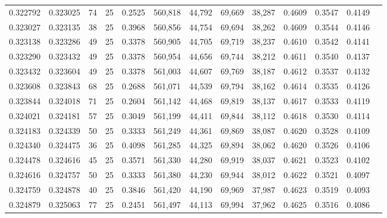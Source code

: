 \begin{tabular}{rrrrrrrrrrrrr}
0.322792 & 0.323025 &    74 &  25 &                                     0.2525 & 560,818 &  44,792 &  69,669 &  38,287 & 0.4609 & 0.3547 & 0.4149 \\
0.323027 & 0.323135 &    38 &  25 &                                     0.3968 & 560,856 &  44,754 &  69,694 &  38,262 & 0.4609 & 0.3544 & 0.4146 \\
0.323138 & 0.323286 &    49 &  25 &                                     0.3378 & 560,905 &  44,705 &  69,719 &  38,237 & 0.4610 & 0.3542 & 0.4141 \\
0.323290 & 0.323432 &    49 &  25 &                                     0.3378 & 560,954 &  44,656 &  69,744 &  38,212 & 0.4611 & 0.3540 & 0.4137 \\
0.323432 & 0.323604 &    49 &  25 &                                     0.3378 & 561,003 &  44,607 &  69,769 &  38,187 & 0.4612 & 0.3537 & 0.4132 \\
0.323608 & 0.323843 &    68 &  25 &                                     0.2688 & 561,071 &  44,539 &  69,794 &  38,162 & 0.4614 & 0.3535 & 0.4126 \\
0.323844 & 0.324018 &    71 &  25 &                                     0.2604 & 561,142 &  44,468 &  69,819 &  38,137 & 0.4617 & 0.3533 & 0.4119 \\
0.324021 & 0.324181 &    57 &  25 &                                     0.3049 & 561,199 &  44,411 &  69,844 &  38,112 & 0.4618 & 0.3530 & 0.4114 \\
0.324183 & 0.324339 &    50 &  25 &                                     0.3333 & 561,249 &  44,361 &  69,869 &  38,087 & 0.4620 & 0.3528 & 0.4109 \\
0.324340 & 0.324475 &    36 &  25 &                                     0.4098 & 561,285 &  44,325 &  69,894 &  38,062 & 0.4620 & 0.3526 & 0.4106 \\
0.324478 & 0.324616 &    45 &  25 &                                     0.3571 & 561,330 &  44,280 &  69,919 &  38,037 & 0.4621 & 0.3523 & 0.4102 \\
0.324616 & 0.324757 &    50 &  25 &                                     0.3333 & 561,380 &  44,230 &  69,944 &  38,012 & 0.4622 & 0.3521 & 0.4097 \\
0.324759 & 0.324878 &    40 &  25 &                                     0.3846 & 561,420 &  44,190 &  69,969 &  37,987 & 0.4623 & 0.3519 & 0.4093 \\
0.324879 & 0.325063 &    77 &  25 &                                     0.2451 & 561,497 &  44,113 &  69,994 &  37,962 & 0.4625 & 0.3516 & 0.4086 \\

\end{tabular}
